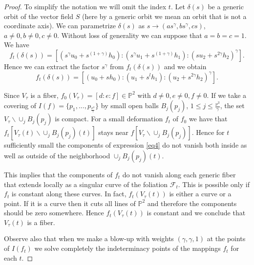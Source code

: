 \documentclass{amsart}
\theoremstyle{definition}
\theoremstyle{proposition}
\numberwithin{equation}{section}
\theoremstyle{main}
\begin{document}
\begin{proof} To simplify the notation we will omit the index $t$. Let $\delta(s)$ be a generic orbit of the vector field $S$ (here by a generic orbit we mean an orbit that is not  a coordinate axis). We can parametrize $\delta(s)$ as $s\to(as^{\gamma},bs^{\gamma},cs)$, $a\neq0,b\neq0,c\neq0$. Without loss of generality we can suppose that $a=b=c=1$.
 We have $$f_{t}(\delta(s))=[(s^{\gamma}u_{0}+s^{(1+\gamma)}h_{0}):(s^{\gamma}u_{1}+s^{(1+\gamma)}h_{1}):(su_{2}+s^{2\gamma}h_{2})^\gamma].$$ Hence we can extract the factor $s^{\gamma}$ from $f_{t}(\delta(s))$ and we obtain \begin{equation}\label{eq4}f_{t}(\delta(s))=[(u_{0}+sh_{0}):(u_{1}+s^{l}h_{1}):(u_{2}+s^{2\gamma}h_{2})^\gamma].\end{equation}

Since $V_{\tau}$ is a fiber, $f_{0}(V_{\tau})=[d:e:f]\in \mathbb P^2$ with $d\neq0,e\neq0,f\neq0$. If we take a covering of $I(f)=\{p_{1},..., p_{\frac{\nu^3}{\gamma}}\}$ by small open balls $B_{j}(p_{j})$, $1\leq j\leq\frac{\nu^3}{\gamma}$, the set $V_{\tau}\backslash\cup_{j}B_{j}(p_{j})$ is compact. For a small deformation $f_{t}$ of $f_{0}$ we have that $f_{t}[V_{\tau}(t)\backslash\cup_{j}B_{j}(p_{j})(t)]$ stays near $f[V_{\tau}\backslash\cup_{j}B_{j}(p_{j})]$. Hence for $t$ sufficiently small the components of expression \ref{eq4} do not vanish both inside as well as outside of the neighborhood $\cup_{j}B_{j}(p_{j})(t)$. 
 
This implies that the components of $f_{t}$ do not vanish along each generic fiber that extends locally as a singular curve of the foliation $\mathcal F_{t}$. This is possible only if $f_{t}$ is constant along these curves. In fact, $f_{t}(V_{\tau}(t))$ is either a curve or a point. If it is a curve then it cuts all lines of $\mathbb P^2$ and therefore the components should be zero somewhere. Hence $f_{t}(V_{\tau}(t))$ is constant and we conclude that $V_{\tau}(t)$ is a fiber.  
 
Observe also that when we make a blow-up with weights $(\gamma,\gamma,1)$ at the points of $I(f_{t})$ we solve completely the indeterminacy points of the mappings $f_{t}$ for each $t$.
\end{proof}
\end{document}
